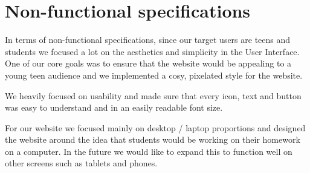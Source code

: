 \section{Non-functional specifications}
\label{sect:non-functional-specifications}

In terms of non-functional specifications, since our target users are teens and students we focused a lot on the aesthetics and simplicity in the User Interface. One of our core goals was to ensure that the website would be appealing to a young teen audience and we implemented a cosy, pixelated style for the website.

We heavily focused on usability and made sure that every icon, text and button was easy to understand and in an easily readable font size. 

For our website we focused mainly on desktop / laptop proportions and designed the website around the idea that students would be working on their homework on a computer. In the future we would like to expand this to function well on other screens such as tablets and phones.

